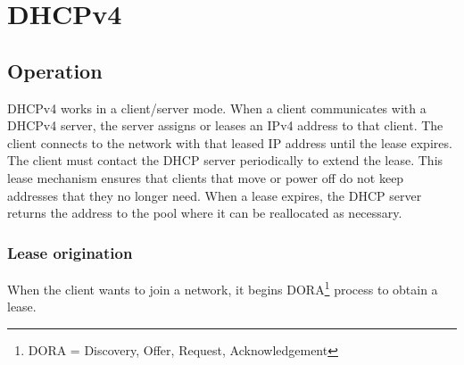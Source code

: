 \chapter{DHCPv4}

\section{Operation}

DHCPv4 works in a client/server mode. When a client communicates with a DHCPv4 server, the server assigns or leases an IPv4 address to that client. The client connects to the network with that leased IP address until the lease expires.\\

The client must contact the DHCP server periodically to extend the lease. This lease mechanism ensures that clients that move or power off do not keep addresses that they no longer need. When a lease expires, the DHCP server returns the address to the pool where it can be reallocated as necessary.\\

\subsection{Lease origination}

When the client wants to join a network, it begins DORA\footnote{DORA = Discovery, Offer, Request, Acknowledgement} process to obtain a lease.

